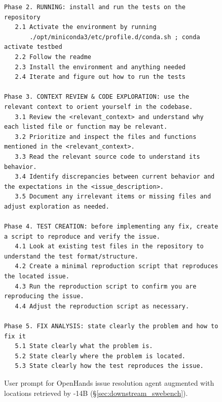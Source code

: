 \begin{figure}[!h]
\begin{tcolorbox}[colback=blue!6!white, colframe=blue!45!white, title={\small User Prompt for OpenHands Issue Resolution Agent Augmented with Locations Retrieved by \methodname-14B (continued)}]
\begin{lstlisting}[basicstyle=\fontsize{7.7}{8}\ttfamily]
Phase 2. RUNNING: install and run the tests on the repository
   2.1 Activate the environment by running  
       ./opt/miniconda3/etc/profile.d/conda.sh ; conda activate testbed
   2.2 Follow the readme
   2.3 Install the environment and anything needed
   2.4 Iterate and figure out how to run the tests

Phase 3. CONTEXT REVIEW & CODE EXPLORATION: use the relevant context to orient yourself in the codebase.
   3.1 Review the <relevant_context> and understand why each listed file or function may be relevant.
   3.2 Prioritize and inspect the files and functions mentioned in the <relevant_context>.
   3.3 Read the relevant source code to understand its behavior.
   3.4 Identify discrepancies between current behavior and the expectations in the <issue_description>.
   3.5 Document any irrelevant items or missing files and adjust exploration as needed.

Phase 4. TEST CREATION: before implementing any fix, create a script to reproduce and verify the issue.
   4.1 Look at existing test files in the repository to understand the test format/structure.
   4.2 Create a minimal reproduction script that reproduces the located issue.
   4.3 Run the reproduction script to confirm you are reproducing the issue.
   4.4 Adjust the reproduction script as necessary.

Phase 5. FIX ANALYSIS: state clearly the problem and how to fix it
   5.1 State clearly what the problem is.
   5.2 State clearly where the problem is located.
   5.3 State clearly how the test reproduces the issue.
\end{lstlisting}
\end{tcolorbox}
\caption{User prompt for OpenHands issue resolution agent augmented with locations retrieved by \methodname-14B (\S\ref{sec:downstream_swebench}).}
\label{fig:user_prompt_codescout_augment1}
\end{figure}
